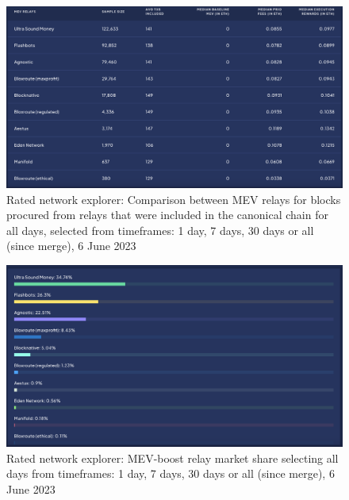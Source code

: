 \documentclass[UTF8]{article}
\begin{document}
\begin{figure}[htbp]
\begin{center}
\includegraphics[width=\linewidth]{images/ratedrelay2}
\caption{Rated network explorer: Comparison between MEV relays for blocks procured from relays that were included in the canonical chain for all days, selected from timeframes: 1 day, 7 days, 30 days or all (since merge), 6 June 2023}
\label{fig:ratedrelay2}
\end{center}
\end{figure}

\begin{figure}[htbp]
\begin{center}
\includegraphics[width=\linewidth]{images/ratedrelay3}
\caption{Rated network explorer: MEV-boost relay market share selecting all days from timeframes: 1 day, 7 days, 30 days or all (since merge), 6 June 2023}
\label{fig:ratedrelay3}
\end{center}
\end{figure}
\end{document}
